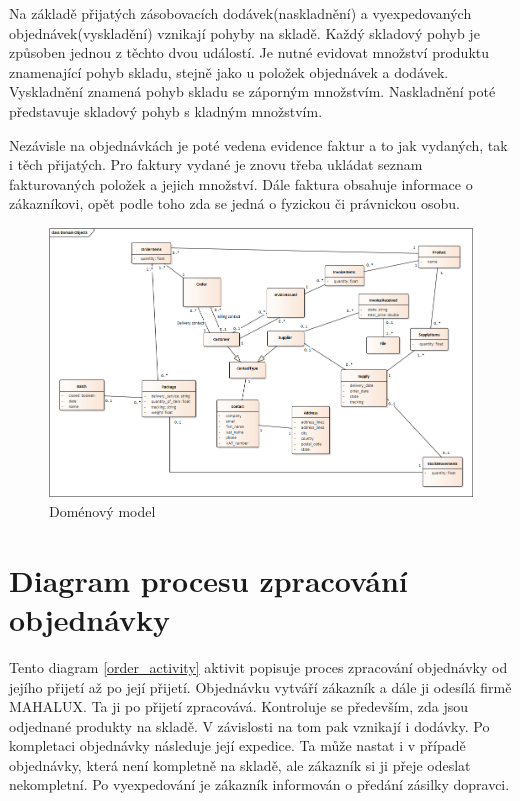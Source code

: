 \documentclass[thesis=B,czech]{FITthesis}[2012/06/26]
\begin{document}
	Na základě přijatých zásobovacích dodávek(naskladnění) a vyexpedovaných objednávek(vyskladění) vznikají pohyby na skladě. Každý skladový pohyb je způsoben jednou z těchto dvou událostí. Je nutné evidovat množství produktu znamenající pohyb skladu, stejně jako u položek objednávek a dodávek. Vyskladnění znamená pohyb skladu se záporným množstvím. Naskladnění poté představuje skladový pohyb s kladným množstvím.
	
	Nezávisle na objednávkách je poté vedena evidence faktur a to jak vydaných, tak i těch přijatých. Pro faktury vydané je znovu třeba ukládat seznam fakturovaných položek a jejich množství. Dále faktura obsahuje informace o zákazníkovi, opět podle toho zda se jedná o fyzickou či právnickou osobu. 
	
\begin{figure}
	\includegraphics[height=\textwidth, angle=90]{domain_model.png}
	\caption{Doménový model}\label{domain_model}
\end{figure}

\section{Diagram procesu zpracování objednávky}
	Tento diagram \ref{order_activity} aktivit popisuje proces zpracování objednávky od jejího přijetí až po její přijetí. Objednávku vytváří zákazník a dále ji odesílá firmě MAHALUX. Ta ji po přijetí zpracovává. Kontroluje se především, zda jsou odjednané produkty na skladě. V závislosti na tom pak vznikají i dodávky. Po kompletaci objednávky následuje její expedice. Ta může nastat i v případě objednávky, která není kompletně na skladě, ale zákazník si ji přeje odeslat nekompletní. Po vyexpedování je zákazník informován o předání zásilky dopravci.
\end{document}
